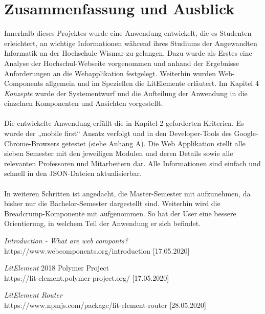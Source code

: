 \documentclass[12pt,					%
							 oneside,			%
							 a4paper,			%
							 halfparskip,		%
							 liststotoc,			%
							 bibtotoc,			%
							 fleqn,				%
							 pointlessnumbers]	%
							 {scrreprt}
\begin{document}
\chapter{Zusammenfassung und Ausblick}     
Innerhalb dieses Projektes wurde eine Anwendung entwickelt, die es Studenten erleichtert, an wichtige Informationen während ihres Studiums der Angewandten Informatik an der Hochschule Wismar zu gelangen. Dazu wurde als Erstes eine Analyse der Hochschul-Webseite vorgenommen und anhand der Ergebnisse Anforderungen an die Webapplikation festgelegt. Weiterhin wurden Web-Components allgemein und im Speziellen die LitElemente erläutert. Im Kapitel 4 \textit{Konzepte} wurde der Systementwurf und die Aufteilung der Anwendung in die einzelnen Komponenten und Ansichten vorgestellt. \\
\\
Die entwickelte Anwendung erfüllt die in Kapitel 2 geforderten Kriterien. Es wurde der „mobile first“ Ansatz verfolgt und in den Developer-Tools des Google-Chrome-Browsers getestet (siehe Anhang A). Die Web Applikation stellt alle sieben Semester mit den jeweiligen Modulen und deren Details sowie alle relevanten Professoren und Mitarbeitern dar. Alle Informationen sind einfach und schnell in den JSON-Dateien aktualisierbar.\\
\\
In weiteren Schritten ist angedacht, die Master-Semester mit aufzunehmen, da bisher nur die Bachelor-Semester dargestellt sind. Weiterhin wird die Breadcrump-Komponente mit aufgenommen. So hat der User eine bessere Orientierung, in welchem Teil der Anwendung er sich befindet.
		
	
	
	\nocite{*}						%


\begin{thebibliography}{unsrt}
 \textit{Introduction - What are web componts?} \\
https://www.webcomponents.org/introduction [17.05.2020]

 \textit{LitElement} 2018 Polymer Project\\
https://lit-element.polymer-project.org/ [17.05.2020]

 \textit{LitElement Router}\\
https://www.npmjs.com/package/lit-element-router [28.05.2020]

\end{thebibliography}	
\end{document}
